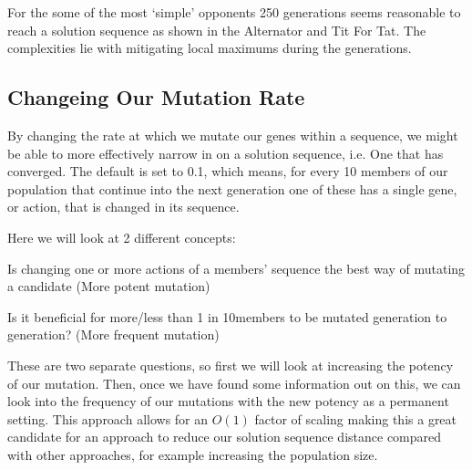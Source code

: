 For the some of the most `simple' opponents 250 generations seems reasonable to reach a solution sequence as shown in the Alternator and Tit For Tat. The complexities lie with mitigating local maximums during the generations.\\
    
\subsection{Changeing Our Mutation Rate}
 By changing the rate at which we mutate our genes within a sequence, we might be able to more effectively narrow in on a solution sequence, i.e. One that has converged. The default is set to 0.1, which means, for every 10 members of our population that continue into the next generation one of these has a single gene, or action, that is changed in its sequence. 
    
Here we will look at 2 different concepts:
\begin{itemize}
    \begin{item}
        Is changing one or more actions of a members' sequence the best way of mutating a candidate (More potent mutation)
    \end{item}
    \begin{item}
        Is it beneficial for more/less than 1 in 10members to be mutated generation to generation? (More frequent mutation)
    \end{item}
\end{itemize}
    
These are two separate questions, so first we will look at increasing the potency of our mutation. Then, once we have found some information out on this, we can look into the frequency of our mutations with the new potency as a permanent setting. This approach allows for an \(O(1)\) factor of scaling making this a great candidate for an approach to reduce our solution sequence distance compared with other approaches, for example increasing the population size.

